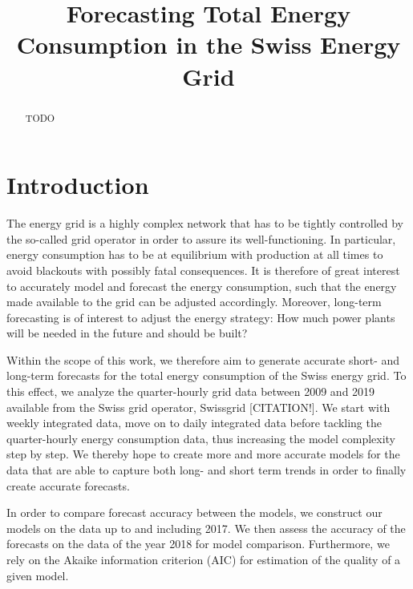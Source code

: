 \documentclass[conference]{IEEEtran}
\begin{document}
\title{Forecasting Total Energy Consumption in the Swiss Energy Grid}

\author{
\and
{}
}


\maketitle

\begin{abstract}
TODO
\end{abstract}


\section{Introduction}
The energy grid is a highly complex network that has to be tightly controlled by the so-called grid operator in order to assure its well-functioning. In particular, energy consumption has to be at equilibrium with production at all times to avoid blackouts with possibly fatal consequences. It is therefore of great interest to accurately model and forecast the energy consumption, such that the energy made available to the grid can be adjusted accordingly. Moreover, long-term forecasting is of interest to adjust the energy strategy: How much power plants will be needed in the future and should be built? 
\par
Within the scope of this work, we therefore aim to generate accurate short- and long-term forecasts for the total energy consumption of the Swiss energy grid. To this effect, we analyze the quarter-hourly grid data between 2009 and 2019 available from the Swiss grid operator, Swissgrid [CITATION!]. We start with weekly integrated data, move on to daily integrated data before tackling the quarter-hourly energy consumption data, thus increasing the model complexity step by step. We thereby hope to create more and more accurate models for the data that are able to capture both long- and short term trends in order to finally create accurate forecasts. 
\par
In order to compare forecast accuracy between the models, we construct our models on the data up to and including 2017. We then assess the accuracy of the forecasts on the data of the year 2018 for model comparison. Furthermore, we rely on the Akaike information criterion (AIC) for estimation of the quality of a given model. 
\end{document}
